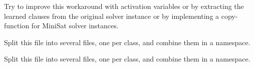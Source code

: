 \begin{DoxyRefList}
\item[\label{todo__todo000009}%
\hypertarget{todo__todo000009}{}%
Member \hyperlink{classMiniSatApi_a27013ace25320f68252bef5ba9f2e9ad}{Mini\-Sat\-Api\-:\-:inc\-Push} ()]Try to improve this workaround with activation variables or by extracting the learned clauses from the original solver instance or by implementing a copy-\/function for Mini\-Sat solver instances.  
\item[\label{todo__todo000010}%
\hypertarget{todo__todo000010}{}%
File \hyperlink{ParallelLearner_8cpp}{Parallel\-Learner.cpp} ]Split this file into several files, one per class, and combine them in a namespace.  
\item[\label{todo__todo000011}%
\hypertarget{todo__todo000011}{}%
File \hyperlink{ParallelLearner_8h}{Parallel\-Learner.h} ]Split this file into several files, one per class, and combine them in a namespace. 
\end{DoxyRefList}